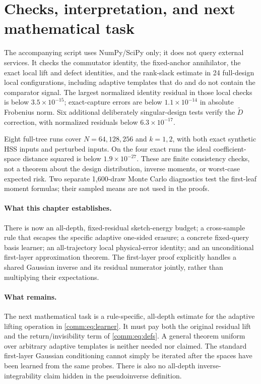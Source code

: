 \documentclass[11pt,oneside,openany,a4paper]{book}
\numberwithin{equation}{chapter}
\theoremstyle{definition}
\theoremstyle{remark}
\begin{document}
\section{Checks, interpretation, and next mathematical task}
The accompanying script uses NumPy/SciPy only; it does not query external services. It checks the commutator identity, the fixed-anchor annihilator, the exact local lift and defect identities, and the rank-slack estimate in 24 full-design local configurations, including adaptive templates that do and do not contain the comparator signal. The largest normalized identity residual in those local checks is below $3.5\times10^{-15}$; exact-capture errors are below $1.1\times10^{-14}$ in absolute Frobenius norm. Six additional deliberately singular-design tests verify the $\widetilde D$ correction, with normalized residuals below $6.3\times10^{-17}$.

Eight full-tree runs cover $N=64,128,256$ and $k=1,2$, with both exact synthetic HSS inputs and perturbed inputs. On the four exact runs the ideal coefficient-space distance squared is below $1.9\times10^{-27}$. These are finite consistency checks, not a theorem about the design distribution, inverse moments, or worst-case expected risk. Two separate 1,600-draw Monte Carlo diagnostics test the first-leaf moment formulas; their sampled means are not used in the proofs.

\paragraph{What this chapter establishes.}
There is now an all-depth, fixed-residual sketch-energy budget; a cross-sample rule that escapes the specific adaptive one-sided erasure; a concrete fixed-query basis learner; an all-trajectory local physical-error identity; and an unconditional first-layer approximation theorem. The first-layer proof explicitly handles a shared Gaussian inverse and its residual numerator jointly, rather than multiplying their expectations.

\paragraph{What remains.}
The next mathematical task is a rule-specific, all-depth estimate for the adaptive lifting operation in \eqref{comm:eq:learner}. It must pay both the original residual lift and the return/invisibility term of \eqref{comm:eq:defs}. A general theorem uniform over arbitrary adaptive templates is neither needed nor claimed. The standard first-layer Gaussian conditioning cannot simply be iterated after the spaces have been learned from the same probes. There is also no all-depth inverse-integrability claim hidden in the pseudoinverse definition.
\end{document}
